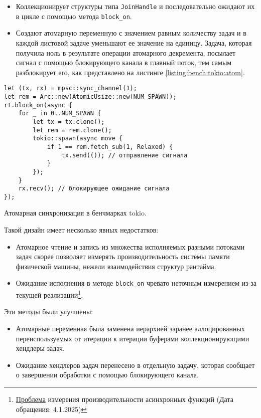 \begin{itemize}
    \item Коллекционирует структуры типа \verb|JoinHandle| и последовательно ожидают их в цикле с помощью метода \verb|block_on|.
    \item Создают атомарную переменную с значением равным количеству задач и в каждой листовой задаче уменьшают ее значение на единицу. Задача, которая получила ноль в результате операции атомарного декремента, посылает сигнал с помощью блокирующего канала в главный поток, тем самым разблокирует его, как представлено на листинге \ref{listing:bench:tokio:atom}.
\end{itemize}

\begin{listing}[H]
    \begin{verbatim}
let (tx, rx) = mpsc::sync_channel(1);
let rem = Arc::new(AtomicUsize::new(NUM_SPAWN));
rt.block_on(async {
    for _ in 0..NUM_SPAWN {
        let tx = tx.clone();
        let rem = rem.clone();
        tokio::spawn(async move {
            if 1 == rem.fetch_sub(1, Relaxed) {
                tx.send(()); // отправление сигнала
            }
        });
    }
    rx.recv(); // блокирующее ожидание сигнала
});
    \end{verbatim}

    \caption{Атомарная синхронизация в бенчмарках tokio.}
    \label{listing:bench:tokio:atom}
\end{listing}

Такой дизайн имеет несколько явных недостатков:

\begin{itemize}
    \item Атомарное чтение и запись из множества исполняемых разными потоками задач скорее позволяет измерять производительность системы памяти физической машины, нежели взаимодействия структур рантайма.
    \item Ожидание исполнения в методе \verb|block_on| чревато неточным измерением из-за текущей реализации\footnote{\href{https://github.com/bheisler/criterion.rs/issues/819}{Проблема} измерения производительности асинхронных функций (Дата обращения: 4.1.2025)}.
\end{itemize}

Эти методы были улучшены:

\begin{itemize}
    \item Атомарные переменная была заменена иерархией заранее аллоцированных переиспользуемых от итерации к итерации буферами коллекционирующими хендлеры задач.
    \item Ожидание хендлеров задач перенесено в отдельную задачу, которая сообщает о завершении обработки с помощью блокирующего канала.
\end{itemize}

